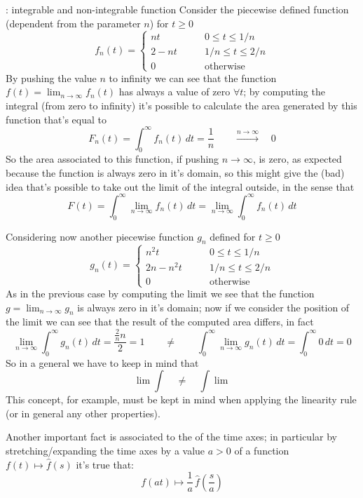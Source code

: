 	\begin{example}{: integrable and non-integrable function} \label{lap:ex:integrationproblem}
		Consider the piecewise defined function (dependent from the parameter $n$) for $t\geq 0$
		\[ f_n(t) = \begin{cases}
			nt & 0 \leq t \leq 1/n \\
			2-nt \qquad & 1/n \leq t \leq 2/n \\ 0 & \textrm{otherwise}
		\end{cases}\]
		By pushing the value $n$ to infinity we can see that the function $f(t)=\lim_{n\rightarrow \infty} f_n(t)$ has always a value of zero $\forall t$; by computing the integral (from zero to infinity) it's possible to calculate the area generated by this function that's equal to
		\[ F_n(t) = \int_0^\infty f_n(t)\, dt = \frac 1 n \qquad \xrightarrow{n\rightarrow \infty} \quad 0\]
		So the area associated to this function, if pushing $n\rightarrow \infty$, is zero, as expected because the function is always zero in it's domain, so this might give the (bad) idea that's possible to take out the limit of the integral outside, in the sense that
		\[  F(t) = \int_0^\infty \lim_{n\rightarrow \infty} f_n(t) \, dt = \lim_{n\rightarrow \infty} \int_0^\infty f_n(t)\, dt\]
		
		\vspace{3mm}
		Considering now another piecewise function $g_n$ defined for $t\geq 0$
		\[ g_n(t) = \begin{cases}
			n^2t & 0 \leq t \leq 1/n \\
			2n-n^2t \qquad & 1/n \leq t \leq 2/n \\ 0 & \textrm{otherwise}
		\end{cases}\]
		As in the previous case by computing the limit we see that the function $g = \lim_{n\rightarrow \infty} g_n$ is always zero in it's domain; now if we consider the position of the limit we can see that the result of the computed area differs, in fact
		\[ \lim_{n\rightarrow\infty} \int_0^\infty g_n(t)\, dt = \frac{\frac 2 n n}{2} = 1 \qquad \neq \qquad \int_0^\infty \lim_{n\rightarrow \infty} g_n(t)\, dt = \int_0^\infty 0\, dt = 0 \]
		So in a general we have to keep in mind that
		\[ \lim \int \quad \neq \quad \int\lim \]
		This concept, for example, must be kept in mind when applying the linearity rule (or in general any other properties).
	\end{example}

	
	Another important fact is associated to the  of the time axes; in particular by stretching/expanding the time axes by a value $a>0$ of a function $f(t) \mapsto \hat f(s)$ it's true that:
	\begin{equation}
		f(at) \mapsto \frac 1 a \, \hat f\left(\frac s a\right)
	\end{equation}

